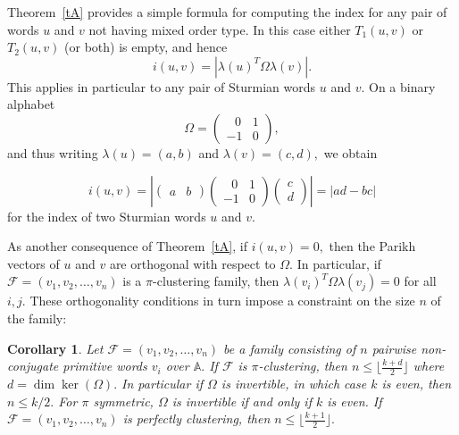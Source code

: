 \documentclass[12pt,a4paper]{amsart}
\newcommand{\A}{{\mathbb A}}
\newtheorem{corollary}{Corollary}
\begin{document}
Theorem~\ref{tA} provides a simple formula for computing the index for any pair of words $u$ and $v$ not having mixed order type. In this case either $T_1(u,v)$ or $T_2(u,v)$ (or both)  is empty, and hence \[i(u,v)= |\lambda (u)^T \Omega \lambda(v)|.\]
This applies in particular to any pair of Sturmian words $u$ and $v.$ 
On a binary alphabet   
\[\Omega=\begin{pmatrix}\,\,\,\,0&1\\-1&0\end{pmatrix},\]
and thus writing $\lambda(u)=(a,b)$ and $\lambda(v)=(c,d),$ we obtain 

\[i(u,v)=|\begin{pmatrix} a & b \end{pmatrix} \begin{pmatrix}\,\,\,\,0&1\\-1&0\end{pmatrix} \begin{pmatrix} c\\d \end{pmatrix}|=|ad-bc|\] 
for the index of two Sturmian words $u$ and $v.$ 


As another consequence of Theorem~\ref{tA}, if $i(u,v)=0,$ then  the Parikh vectors of $u$ and $v$ are orthogonal with respect to $\Omega.$  In particular, if 
 $\mathcal F=(v_1,v_2,\ldots ,v_n)$ is a $\pi$-clustering family, then $\lambda(v_i)^T\Omega \lambda (v_j)=0$ for all $i,j.$ These orthogonality conditions in turn impose a constraint on the size $n$ of the family:

\begin{corollary}\label{cA}
Let $\mathcal F=(v_1,v_2,\ldots ,v_n)$ be a family consisting of $n$ pairwise non-conjugate primitive words $v_i$ over $\A.$ If $\mathcal F$ is $\pi$-clustering, then $n\leq \lfloor \frac {k+d}{2} \rfloor $ 
where $d=\dim \ker (\Omega).$ In particular if $\Omega$ is invertible, in which case $k$ is even,   then $n\leq k/2.$ For $\pi$ symmetric,  $\Omega$ is invertible if and only if $k$ is even. If $\mathcal F=(v_1,v_2,\ldots ,v_n)$ is  perfectly clustering,  then $n\leq \lfloor \frac {k+1}{2} \rfloor. $ 
\end{corollary}

\end{document}
